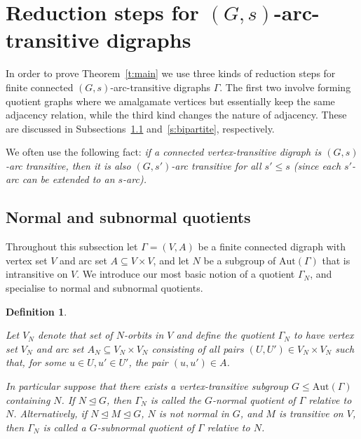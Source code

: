 \documentclass[11pt]{amsart}
\newtheorem{definition}[theorem]{Definition}
\newcommand{\Aut}{\mathrm{Aut}}
\begin{document}



\section{Reduction steps for $(G,s)$-arc-transitive digraphs}\label{s:redn}

In order to prove Theorem~\ref{t:main} we use three kinds of reduction steps for finite connected $(G,s)$-arc-transitive digraphs $\Gamma$. The first two involve forming quotient graphs where we amalgamate vertices but essentially keep the same adjacency relation, while the third kind changes the nature of adjacency. These are discussed in  Subsections~\ref{s:nquot} and~\ref{s:bipartite}, respectively.  

We often use the following fact: \emph{if a connected vertex-transitive digraph is $(G,s)$-arc transitive, then it is also $(G,s')$-arc transitive for all $s'\leqslant s$ (since each $s'$-arc can be extended to an $s$-arc).}  

\subsection{Normal and subnormal quotients}\label{s:nquot}

Throughout this subsection let  \(\Gamma=(V,A)\) be a finite connected digraph with vertex set $V$ and arc set $A\subseteq V\times V$, and let $N$ be a subgroup of $\Aut(\Gamma)$ that is intransitive on $V$.
We introduce our most basic notion of a quotient $\Gamma_N$, and specialise to normal and subnormal quotients.

\begin{definition}\label{d:nquot}
{\rm 
    Let $V_N$ denote that set of $N$-orbits in $V$ and define the \emph{quotient} \(\Gamma_N\) to have vertex set $V_N$ and arc set $A_N\subseteq V_N\times V_N$ consisting of all pairs $(U,U')\in V_N\times V_N$ such that,  for some $u\in U, u'\in U'$, the pair $(u,u')\in A$.  

    In particular suppose that there exists a vertex-transitive subgroup $G\leq \Aut(\Gamma)$ containing $N$. If $N\unlhd G$, then $\Gamma_N$ is called the \emph{$G$-normal quotient of $\Gamma$ relative to $N$}. Alternatively, if $N \unlhd M\unlhd G$, $N$ is not normal in $G$, and $M$ is transitive on $V$, then $\Gamma_N$ is called a \emph{$G$-subnormal quotient of $\Gamma$ relative to $N$}.
    }
\end{definition}
\end{document}
